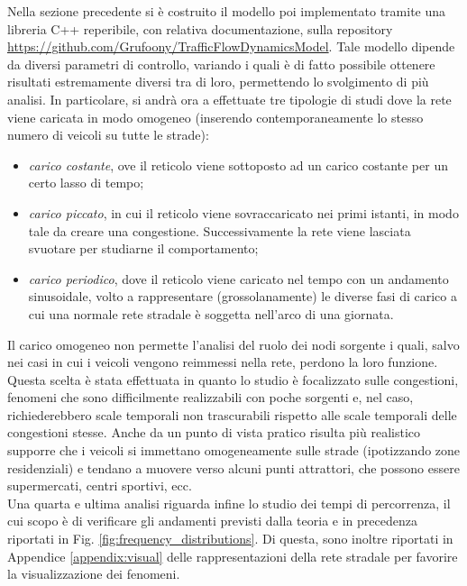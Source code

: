 \documentclass[../main.tex]{subfiles}
\begin{document}
Nella sezione precedente si \`e costruito il modello poi implementato tramite una libreria C++ reperibile, con relativa documentazione, sulla repository \url{https://github.com/Grufoony/TrafficFlowDynamicsModel}.
Tale modello dipende da diversi parametri di controllo, variando i quali \`e di fatto possibile ottenere risultati estremamente diversi tra di loro, permettendo lo svolgimento di pi\`u analisi.
In particolare, si andr\`a ora a effettuate tre tipologie di studi dove la rete viene caricata in modo omogeneo (inserendo contemporaneamente lo stesso numero di veicoli su tutte le strade):
\begin{itemize}
    \item \emph{carico costante}, ove il reticolo viene sottoposto ad un carico costante per un certo lasso di tempo;
    \item \emph{carico piccato}, in cui il reticolo viene sovraccaricato nei primi istanti, in modo tale da creare una congestione. Successivamente la rete viene lasciata svuotare per studiarne il comportamento;
    \item \emph{carico periodico}, dove il reticolo viene caricato nel tempo con un andamento sinusoidale, volto a rappresentare (grossolanamente) le diverse fasi di carico a cui una normale rete stradale \`e soggetta nell'arco di una giornata.
\end{itemize}
Il carico omogeneo non permette l'analisi del ruolo dei nodi sorgente i quali, salvo nei casi in cui i veicoli vengono reimmessi nella rete, perdono la loro funzione.
Questa scelta \`e stata effettuata in quanto lo studio \`e focalizzato sulle congestioni, fenomeni che sono difficilmente realizzabili con poche sorgenti e, nel caso, richiederebbero scale temporali non trascurabili rispetto alle scale temporali delle congestioni stesse.
Anche da un punto di vista pratico risulta pi\`u realistico supporre che i veicoli si immettano omogeneamente sulle strade (ipotizzando zone residenziali) e tendano a muovere verso alcuni punti attrattori, che possono essere supermercati, centri sportivi, ecc.\\
Una quarta e ultima analisi riguarda infine lo studio dei tempi di percorrenza, il cui scopo \`e di verificare gli andamenti previsti dalla teoria e in precedenza riportati in Fig. \ref{fig:frequency_distributions}.
Di questa, sono inoltre riportati in Appendice \ref{appendix:visual} delle rappresentazioni della rete stradale per favorire la visualizzazione dei fenomeni.
\end{document}

